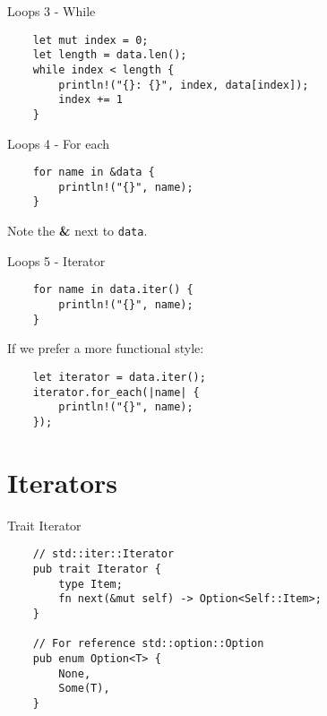 \documentclass[aspectratio=1610,t]{beamer}
\begin{document}
\begin{frame}[fragile]{Loops 3 - While}
\begin{verbatim}
    let mut index = 0;
    let length = data.len();
    while index < length {
        println!("{}: {}", index, data[index]);
        index += 1
    }
\end{verbatim}
\end{frame}

\begin{frame}[fragile]{Loops 4 - For each}
\begin{verbatim}
    for name in &data {
        println!("{}", name);
    }
\end{verbatim}

Note the \textbf{\&} next to \texttt{data}.
\end{frame}

\begin{frame}[fragile]{Loops 5 - Iterator}
\begin{verbatim}
    for name in data.iter() {
        println!("{}", name);
    }
\end{verbatim}

If we prefer a more functional style:
\begin{verbatim}
    let iterator = data.iter();
    iterator.for_each(|name| {
        println!("{}", name);
    });
\end{verbatim}
\end{frame}


{
\section{Iterators}
}

\begin{frame}[fragile]{Trait Iterator}
\begin{verbatim}
    // std::iter::Iterator
    pub trait Iterator {
        type Item;
        fn next(&mut self) -> Option<Self::Item>;
    }

    // For reference std::option::Option
    pub enum Option<T> {
        None,
        Some(T),
    }
\end{verbatim}
\end{frame}
\end{document}
